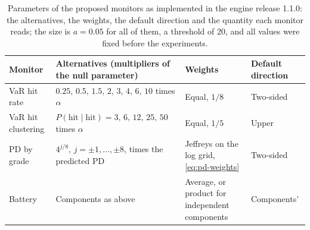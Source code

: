 \begin{table}[htbp]
\centering
\small
\caption{Parameters of the proposed monitors as implemented in the engine release 1.1.0: the alternatives, the weights, the default direction and the quantity each monitor reads; the size is $a=0.05$ for all of them, a threshold of 20, and all values were fixed before the experiments.}
\label{tab:parameters}
\begin{tabularx}{\textwidth}{>{\raggedright\arraybackslash}p{3.2cm}>{\raggedright\arraybackslash}X>{\raggedright\arraybackslash}p{3.6cm}>{\raggedright\arraybackslash}p{2.2cm}}
\toprule
Monitor & Alternatives (multipliers of the null parameter) & Weights & Default direction \\
\midrule
VaR hit rate & $0.25,\,0.5,\,1.5,\,2,\,3,\,4,\,6,\,10$ times $\alpha$ & Equal, $1/8$ & Two-sided \\
VaR hit clustering & $P(\text{hit}\mid\text{hit})=3,\,6,\,12,\,25,\,50$ times $\alpha$ & Equal, $1/5$ & Upper \\
PD by grade & $4^{j/8}$, $j=\pm1,\dots,\pm8$, times the predicted PD & Jeffreys on the log grid, \cref{eq:pd-weights} & Two-sided \\
Battery & Components as above & Average, or product for independent components & Components' \\
\bottomrule
\end{tabularx}
\end{table}
